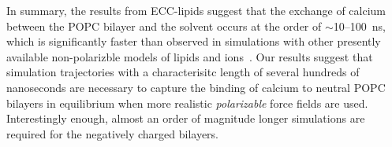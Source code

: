 In summary, the results from ECC-lipids suggest 
that the exchange of calcium between the POPC bilayer and the solvent 
occurs at the order of $\sim$10--100~ns, 
which is significantly faster than observed in simulations 
with other presently available non-polarizble models of lipids and ions~\citep{javanainen17, catte16}. 
Our results suggest 
that simulation trajectories with a characterisitc length of several hundreds of nanoseconds 
are necessary to capture the binding of calcium to neutral POPC bilayers 
in equilibrium when more realistic \emph{polarizable} force fields are used. 
Interestingly enough, almost an order of magnitude longer simulations
are required for the negatively charged bilayers. 

 


